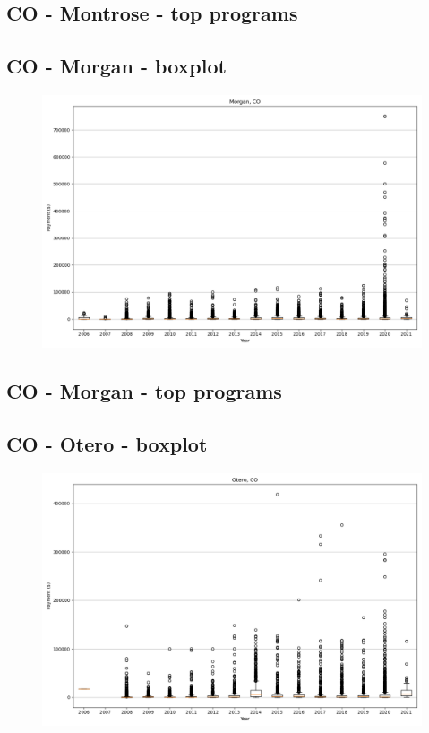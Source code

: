 \subsection*{CO - Montrose - top programs}

\newpage
\subsection*{CO - Morgan - boxplot}
\begin{figure}[h]
\centering
\includegraphics[width=7in]{../output/boxplots/counties/Morgan-CO_boxplot.png}
\end{figure}


\subsection*{CO - Morgan - top programs}

\newpage
\subsection*{CO - Otero - boxplot}
\begin{figure}[h]
\centering
\includegraphics[width=7in]{../output/boxplots/counties/Otero-CO_boxplot.png}
\end{figure}


